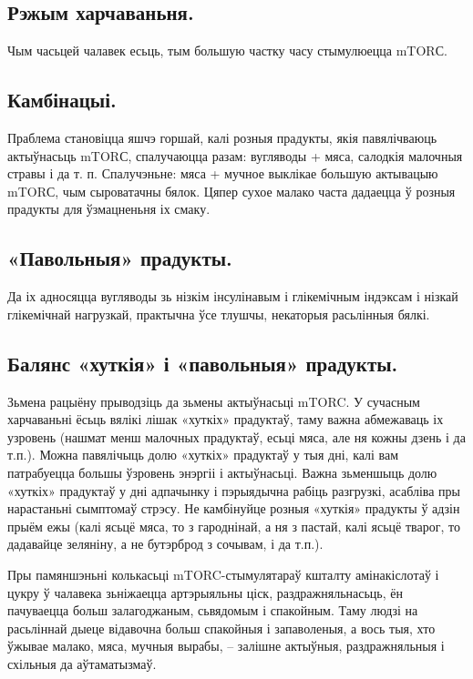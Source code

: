 \subsection{Рэжым харчаваньня.}
Чым часьцей чалавек есьць, тым большую частку часу стымулюецца mTORС.

\subsection{Камбінацыі.}
Праблема становіцца яшчэ горшай, калі розныя прадукты, якія павялічваюць актыўнасьць mTORС, спалучаюцца разам: вугляводы + мяса, салодкія малочныя стравы і да т. п. Спалучэньне: мяса + мучное выклікае большую актывацыю mTORС, чым сыроватачны бялок. Цяпер сухое малако часта дадаецца ў розныя прадукты для ўзмацненьня іх смаку.

\subsection{«Павольныя» прадукты.}
Да іх адносяцца вугляводы зь нізкім інсулінавым і глікемічным індэксам і нізкай глікемічнай нагрузкай, практычна ўсе тлушчы, некаторыя расьлінныя бялкі.

\subsection{Балянс «хуткія» і «павольныя» прадукты.}
Зьмена рацыёну прыводзіць да зьмены актыўнасьці mTORC. У сучасным харчаваньні ёсьць вялікі лішак «хуткіх» прадуктаў, таму важна абмежаваць іх узровень (нашмат менш малочных прадуктаў, есьці мяса, але ня кожны дзень і да т.п.). Можна павялічыць долю «хуткіх» прадуктаў у тыя дні, калі вам патрабуецца большы ўзровень энэргіі і актыўнасьці. Важна зьменшыць долю «хуткіх» прадуктаў у дні адпачынку і пэрыядычна рабіць разгрузкі, асабліва пры нарастаньні сымптомаў стрэсу. Не камбінуйце розныя «хуткія» прадукты ў адзін прыём ежы (калі ясьцё мяса, то з гароднінай, а ня з пастай, калі ясьцё тварог, то дадавайце зеляніну, а не бутэрброд з сочывам, і да т.п.).

Пры памяншэньні колькасьці mTORC-стымулятараў кшталту амінакіслотаў і цукру ў чалавека зьніжаецца артэрыяльны ціск, раздражняльнасьць, ён пачуваецца больш залагоджаным, сьвядомым і спакойным. Таму людзі на расьліннай дыеце відавочна больш спакойныя і запаволеныя, а вось тыя, хто ўжывае малако, мяса, мучныя вырабы, – залішне актыўныя, раздражняльныя і схільныя да аўтаматызмаў.

